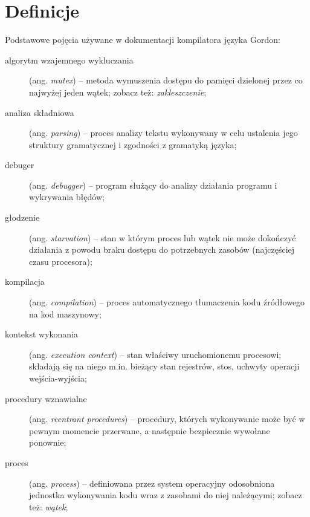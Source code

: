\documentclass{documentation}
\begin{document}
\section{Definicje}
\noindent Podstawowe pojęcia używane w dokumentacji kompilatora języka Gordon:
\\
\begin{description}
    \item[algorytm wzajemnego wykluczania] (ang. \emph{mutex}) -- metoda
    wymuszenia dostępu do pamięci dzielonej przez co najwyżej jeden wątek;
    zobacz też: \emph{zakleszczenie};\\

    \item[analiza składniowa] (ang. \emph{parsing}) -- proces analizy tekstu
    wykonywany w celu ustalenia jego struktury gramatycznej i zgodności z
    gramatyką języka;\\

    \item[debuger] (ang. \emph{debugger}) -- program służący do analizy
    działania programu i wykrywania błędów;\\

    \item[głodzenie] (ang. \emph{starvation}) -- stan w którym proces lub
    wątek nie może dokończyć działania z powodu braku dostępu do potrzebnych
    zasobów (najczęściej czasu procesora);\\

    \item[kompilacja] (ang. \emph{compilation}) -- proces automatycznego
    tłumaczenia kodu źródłowego na kod maszynowy;\\

    \item[kontekst wykonania] (ang. \emph{execution context}) -- stan właściwy
    uruchomionemu procesowi; składają się na niego m.in. bieżący stan
    rejestrów, stos, uchwyty operacji wejścia-wyjścia;\\

    \item[procedury wznawialne] (ang. \emph{reentrant procedures}) --
    procedury, których wykonywanie może być w pewnym momencie przerwane, a
    następnie bezpiecznie wywołane ponownie;\\

    \item[proces] (ang. \emph{process}) -- definiowana przez system operacyjny
    odosobniona jednostka wykonywania kodu wraz z zasobami do niej należącymi;
    zobacz też: \emph{wątek};\\


\end{description}
\end{document}
